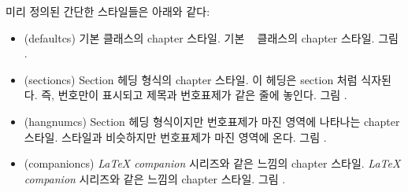 미리 정의된 간단한 스타일들은 아래와 같다:
\begin{itemize}
\item[\cstyle{default}]
\glossary(defaultcs)%
  {}%
  {기본  클래스의 chapter 스타일.}
기본 \ltx\  클래스의 chapter 스타일. 그림 .

\item[\cstyle{section}]
\glossary(sectioncs)%
  {}%
  {Section 헤딩 형식의 chapter 스타일.}
이 헤딩은 section 처럼 식자된다.
즉, 번호만이 표시되고 제목과 번호표제가 같은 줄에 놓인다. 그림 .


\item[\cstyle{hangnum}]
\glossary(hangnumcs)%
  {}%
  {Section 헤딩 형식이지만 번호표제가 마진 영역에 나타나는 chapter 스타일.}
 스타일과 비슷하지만 번호표제가 마진 영역에 온다. 그림 .

\item[\cstyle{companion}]
\glossary(companioncs)%
  {}%
  {\textit{LaTeX companion} 시리즈와 같은 느낌의 chapter 스타일.}
\textit{LaTeX companion} 시리즈와 같은 느낌의 chapter 스타일. 그림 .


\end{itemize}
